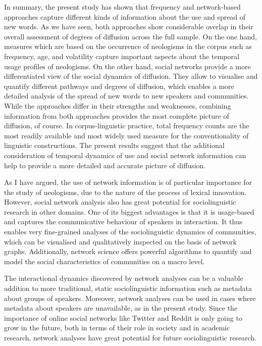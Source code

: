 \documentclass[
  a4paper,
  abstract=on,
  captions=tableabove,
  ]{scrartcl}
\begin{document}
    In summary, the present study has shown that frequency and network-based approaches capture different kinds of information about the use and spread of new words. As we have seen, both approaches show considerable overlap in their overall assessment of degrees of diffusion across the full sample. On the one hand, measures which are based on the occurrence of neologisms in the corpus such as frequency, age, and volatility capture important aspects about the temporal usage profiles of neologisms. On the other hand, social networks provide a more differentiated view of the social dynamics of diffusion. They allow to visualise and quantify different pathways and degrees of diffusion, which enables a more detailed analysis of the spread of new words to new speakers and communities. While the approaches differ in their strengths and weaknesses, combining information from both approaches provides the most complete picture of diffusion, of course. In corpus-linguistic practice, total frequency counts are the most readily available and most widely used measure for the conventionality of linguistic constructions. The present results suggest that the additional consideration of temporal dynamics of use and social network information can help to provide a more detailed and accurate picture of diffusion.

  As I have argued, the use of network information is of particular importance for the study of neologisms, due to the nature of the process of lexical innovation. However, social network analysis also has great potential for sociolinguistic research in other domains. One of its biggest advantages is that it is usage-based and captures the communicative behaviour of speakers in interaction. It thus enables very fine-grained analyses of the sociolinguistic dynamics of communities, which can be visualised and qualitatively inspected on the basis of network graphs. Additionally, network science offers powerful algorithms to quantify and model the social characteristics of communities on a macro level.

    The interactional dynamics discovered by network analyses can be a valuable addition to more traditional, static sociolinguistic information such as metadata about groups of speakers. Moreover, network analyses can be used in cases where metadata about speakers are unavailable, as in the present study. Since the importance of online social networks like Twitter and Reddit is only going to grow in the future, both in terms of their role in society and in academic research, network analyses have great potential for future sociolinguistic research.
\end{document}
